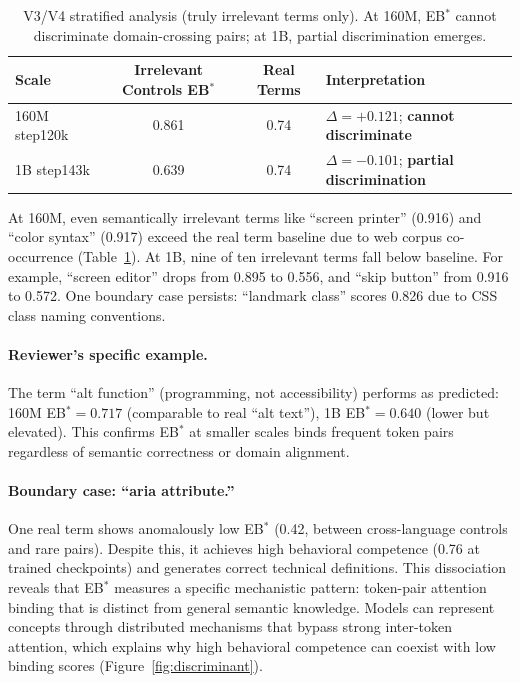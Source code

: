 \documentclass[10pt]{article} %
\begin{document}
\begin{table}[h]
\centering
\small
\begin{tabular}{|l|c|c|l|}
\hline
\textbf{Scale} & \textbf{Irrelevant Controls EB$^*$} & \textbf{Real Terms} & \textbf{Interpretation} \\
\hline
160M step120k & 0.861 & 0.74 & $\Delta=+0.121$; \textbf{cannot discriminate} \\
1B step143k & 0.639 & 0.74 & $\Delta=-0.101$; \textbf{partial discrimination} \\
\hline
\end{tabular}
\caption{V3/V4 stratified analysis (truly irrelevant terms only). At 160M, EB$^*$ cannot discriminate domain-crossing pairs; at 1B, partial discrimination emerges.}
\label{tab:v3v4_stratified}
\end{table}

At 160M, even semantically irrelevant terms like ``screen printer'' (0.916) and ``color syntax'' (0.917) exceed the real term baseline due to web corpus co-occurrence (Table~\ref{tab:v3v4_stratified}). At 1B, nine of ten irrelevant terms fall below baseline. For example, ``screen editor'' drops from 0.895 to 0.556, and ``skip button'' from 0.916 to 0.572. One boundary case persists: ``landmark class'' scores 0.826 due to CSS class naming conventions.

\paragraph{Reviewer's specific example.}
The term ``alt function'' (programming, not accessibility) performs as predicted: 160M EB$^*=0.717$ (comparable to real ``alt text''), 1B EB$^*=0.640$ (lower but elevated).
This confirms EB$^*$ at smaller scales binds frequent token pairs regardless of semantic correctness or domain alignment.

\paragraph{Boundary case: ``aria attribute.''}
One real term shows anomalously low EB$^*$ (0.42, between cross-language controls and rare pairs).
Despite this, it achieves high behavioral competence (0.76 at trained checkpoints) and generates correct technical definitions.
This dissociation reveals that EB$^*$ measures a specific mechanistic pattern: token-pair attention binding that is distinct from general semantic knowledge. Models can represent concepts through distributed mechanisms that bypass strong inter-token attention, which explains why high behavioral competence can coexist with low binding scores (Figure~\ref{fig:discriminant}).
\end{document}
